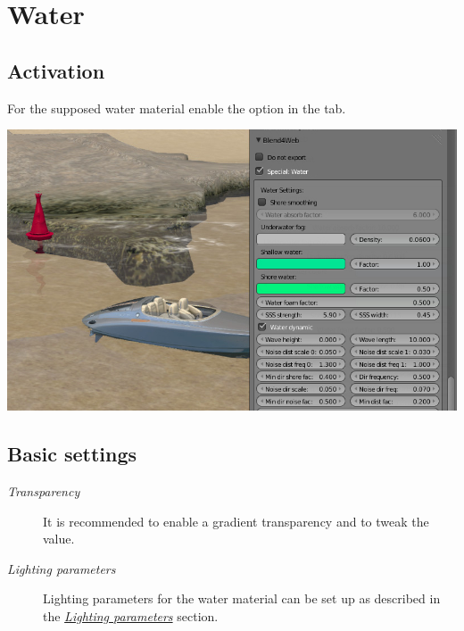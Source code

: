 \documentclass[a4paper,12pt,oneside]{sphinxmanual}
\begin{document}
\section{Water}
\label{outdoor_rendering:id2}

\subsection{Activation}
\label{outdoor_rendering:id3}
For the supposed water material enable the  option in the  tab.

{\hfill\includegraphics[width=1.000\linewidth]{water_material_setup.jpg}\hfill}


\subsection{Basic settings}
\label{outdoor_rendering:id4}\begin{description}
\item[{\emph{Transparency}}] \leavevmode
It is recommended to enable a gradient transparency  and to tweak the  value.

\item[{\emph{Lighting parameters}}] \leavevmode
Lighting parameters for the water material can be set up as described in the {\hyperref[materials:material-lighting-params]{\emph{Lighting parameters}}} section.

\end{description}
\end{document}
